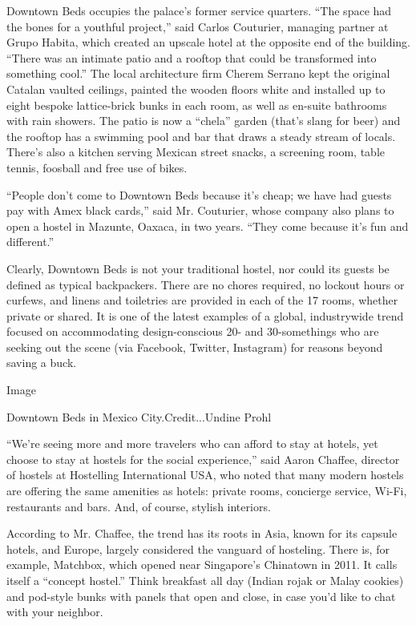 Downtown Beds occupies the palace's former service quarters. ``The space
had the bones for a youthful project,'' said Carlos Couturier, managing
partner at Grupo Habita, which created an upscale hotel at the opposite
end of the building. ``There was an intimate patio and a rooftop that
could be transformed into something cool.'' The local architecture firm
Cherem Serrano kept the original Catalan vaulted ceilings, painted the
wooden floors white and installed up to eight bespoke lattice-brick
bunks in each room, as well as en-suite bathrooms with rain showers. The
patio is now a ``chela'' garden (that's slang for beer) and the rooftop
has a swimming pool and bar that draws a steady stream of locals.
There's also a kitchen serving Mexican street snacks, a screening room,
table tennis, foosball and free use of bikes. ~

``People don't come to Downtown Beds because it's cheap; we have had
guests pay with Amex black cards,'' said Mr. Couturier, whose company
also plans to open a hostel in Mazunte, Oaxaca, in two years. ``They
come because it's fun and different.''

Clearly, Downtown Beds is not your traditional hostel, nor could its
guests be defined as typical backpackers. There are no chores required,
no lockout hours or curfews, and linens and toiletries are provided in
each of the 17 rooms, whether private or shared. It is one of the latest
examples of a global, industrywide trend focused on accommodating
design-conscious 20- and 30-somethings who are seeking out the scene
(via Facebook, Twitter, Instagram) for reasons beyond saving a buck.

Image

Downtown Beds in Mexico City.Credit...Undine Prohl

``We're seeing more and more travelers who can afford to stay at hotels,
yet choose to stay at hostels for the social experience,'' said Aaron
Chaffee, director of hostels at Hostelling International USA, who noted
that many modern hostels are offering the same amenities as hotels:
private rooms, concierge service, Wi-Fi, restaurants and bars. And, of
course, stylish interiors.

According to Mr. Chaffee, the trend has its roots in Asia, known for its
capsule hotels, and Europe, largely considered the vanguard of
hosteling. There is, for example, Matchbox, which opened near
Singapore's Chinatown in 2011. It calls itself a ``concept hostel.''
Think breakfast all day (Indian rojak or Malay cookies) and pod-style
bunks with panels that open and close, in case you'd like to chat with
your neighbor.


